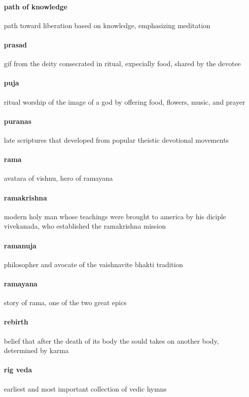\documentclass{article}
\begin{document}
\paragraph{path of knowledge}
\label{par:path_of_knowledge}
path toward liberation based on knowledge, emphasizing meditation
\paragraph{prasad}
\label{par:prasad}
gif from the deity consecrated in ritual, expecially food, shared by the devotee
\paragraph{puja}
\label{par:puja}
ritual worship of the image of a god by offering food, flowers, music, and prayer
\paragraph{puranas}
\label{par:puranas}
late scriptures that developed from popular theistic devotional movements
\paragraph{rama}
\label{par:rama}
avatara of vishnu, hero of ramayana
\paragraph{ramakrishna}
\label{par:ramakrishna}
modern holy man whose teachings were brought to america by his diciple vivekanada, who established the ramakrishna mission
\paragraph{ramanuja}
\label{par:ramanuja}
philosopher and avocate of the vaishnavite bhakti tradition
\paragraph{ramayana}
\label{par:ramayana}
story of rama, one of the two great epics
\paragraph{rebirth}
\label{par:rebirth}
belief that after the death of its body the sould takes on another body, determined by karma
\paragraph{rig veda}
\label{par:rig_veda}
earliest and most important collection of vedic hymns
\end{document}
